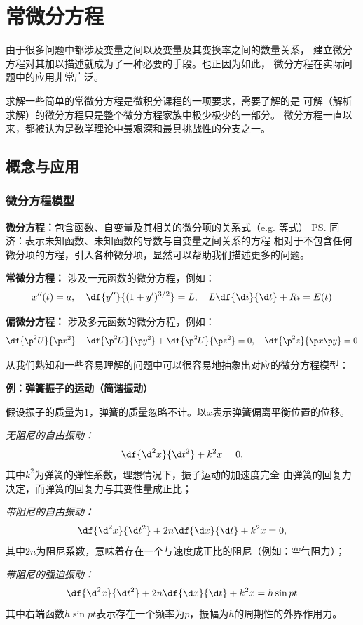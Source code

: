 \setcounter{chapter}{6}

\chapter{常微分方程}

由于很多问题中都涉及变量之间以及变量及其变换率之间的数量关系，
建立微分方程对其加以描述就成为了一种必要的手段。也正因为如此，
微分方程在实际问题中的应用非常广泛。

求解一些简单的常微分方程是微积分课程的一项要求，需要了解的是
可解（解析求解）的微分方程只是整个微分方程家族中极少极少的一部分。
微分方程一直以来，都被认为是数学理论中最艰深和最具挑战性的分支之一。


\section{概念与应用}

\subsection{微分方程模型}

{\bf 微分方程：}包含函数、自变量及其相关的微分项的关系式（e.g. 等式）
\ps{同济：表示未知函数、未知函数的导数与自变量之间关系的方程}
相对于不包含任何微分项的方程，引入各种微分项，显然可以帮助我们描述更多的问题。

{\bf 常微分方程：} 涉及一元函数的微分方程，例如：
  $$x''(t)=a,\quad  \df{y''}{(1+y')^{3/2}}=L,\quad 
  L\df{\d i}{\d t}+Ri=E(t)$$ 
  
{\bf 偏微分方程：} 涉及多元函数的微分方程，例如：
  $$\df{\p^2U}{\p x^2}+\df{\p^2U}{\p y^2}+\df{\p^2U}{\p z^2}=0,\quad 
  \df{\p^2z}{\p x\p y}=0$$

从我们熟知和一些容易理解的问题中可以很容易地抽象出对应的微分方程模型：

{\bf 例：弹簧振子的运动（简谐振动）}

假设振子的质量为$1$，弹簧的质量忽略不计。以$x$表示弹簧偏离平衡位置的位移。

{\it 无阻尼的自由振动：}
$$\df{\d^2 x}{\d t^2}+k^2x=0,$$
其中$k^2$为弹簧的{\kaishu 弹性系数}，理想情况下，振子运动的加速度完全
由弹簧的回复力决定，而弹簧的回复力与其变性量成正比；

{\it 带阻尼的自由振动：}
$$\df{\d^2 x}{\d t^2}+2n\df{\d x}{\d t}+k^2x=0,$$
其中$2n$为{\kaishu 阻尼系数}，意味着存在一个与速度成正比的阻尼（例如：空气阻力）；

{\it 带阻尼的强迫振动：}
$$\df{\d^2 x}{\d t^2}+2n\df{\d x}{\d t}+k^2x=h\sin pt$$
其中右端函数$h\sin pt$表示存在一个频率为$p$，振幅为$h$的周期性的外界作用力。

